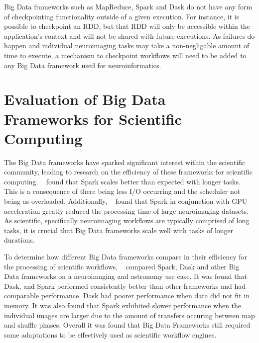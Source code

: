 \documentclass{report}
\newcommand{\note}[1]{\textcolor{blue}{\textit{note}: #1}}
\begin{document}
            Big Data frameworks such as MapReduce, Spark and Dask do not have   
            any form of checkpointing functionality outside of a given          
            execution. For instance, it is possible to checkpoint an RDD, but   
            that RDD will only be accessible within the application's context   
            and will not be shared with future executions. As failures do       
            happen and individual neuroimaging tasks may take a non-negligable  
            amount of time to execute, a mechanism to checkpoint workflows      
            will need to be added to any Big Data framework used for             
            neuroinformatics.                                                   

                                                                                
        \section{Evaluation of Big Data Frameworks for Scientific Computing}\label{eval}     
            The Big Data frameworks have sparked significant interest within the 
            scientific community, leading to research on the efficiency of      
            these frameworks for scientific computing. ~\cite{souza2017spark} found  
            that Spark scales better than expected with longer tasks. This is   
            a consequence of there being less I/O occurring and the scheduler 
            not being as overloaded. 
            Additionally, ~\cite{boubela2016big} found that Spark in conjunction with  
            GPU acceleration greatly reduced the processing time of large       
            neuroimaging datasets.                                              
            As scientific, specifically neuroimaging workflows are typically    
            comprised of long tasks, it                                         
            is crucial that Big Data frameworks scale well with tasks of longer  
            durations.
    
            To determine how different Big Data frameworks compare in their 
            efficiency for the processing of scientific workflows, 
            ~\cite{mehta2017comparative} compared Spark, Dask and other Big Data 
            frameworks on
            a neuroimaging and astronomy use case. It was found that Dask, 
            and Spark performed consistently better than other frameworks and 
            had comparable 
            performance. Dask had poorer performance when data did not fit in
            memory. It was also found that Spark exhibited slower performance 
            when the individual images are larger due to the amount of transfers
            occuring between map and shuffle phases. Overall it was
            found that Big Data Frameworks still required some adaptations to be
            effectively used as scientific workflow engines.            
            
\end{document}
